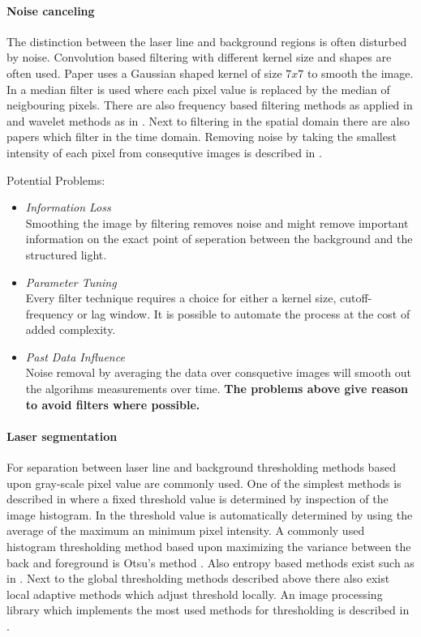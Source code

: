 \paragraph{Noise canceling} \label{p: noise_canceling}
The distinction between the laser line and background regions is often disturbed by noise. Convolution based filtering with different kernel size and shapes are often used. Paper \cite{huang2012development} uses a Gaussian shaped kernel of size $7x7$ to smooth the image. In \cite{zhang2007vision} a median filter is used where each pixel value is replaced by the median of neigbouring pixels. There are also frequency based filtering methods as applied in \cite{uzun2005fpga} and wavelet methods as in \cite{liu2006image}. Next to filtering in the spatial domain there are also papers which filter in the time domain. Removing noise by taking the smallest intensity of each pixel from consequtive images is described in \cite{li2010measurement}.

\skippar
Potential Problems:
\begin{itemize}
\item \textit{Information Loss} \label{pblm: info_loss2} \\
Smoothing the image by filtering removes noise and might remove important information on the exact point of seperation between the background and the structured light. 
\item \textit{Parameter Tuning} \label{pblm: parameter_tuning} \\
Every filter technique requires a choice for either a kernel size, cutoff-frequency or lag window. It is possible to automate the process at the cost of added complexity. 
\item \textit{Past Data Influence} \label{pblm: past_data} \\
Noise removal by averaging the data over consquetive images will smooth out the algorihms measurements over time. \textbf{The problems above give reason to avoid filters where possible.}
\end{itemize}

\paragraph{Laser segmentation}
For separation between laser line and background thresholding methods based upon gray-scale pixel value are commonly used. One of the simplest methods is described in \cite{zhang2007vision} where a fixed threshold value is determined by inspection of the image histogram. In \cite{wang2014weld} the threshold value is automatically determined by using the average of the maximum an minimum pixel intensity. A commonly used histogram thresholding method based upon maximizing the variance between the back and foreground is Otsu's method \cite{otsu1979threshold}. Also entropy based methods exist such as in \cite{liu2006image}. Next to the global thresholding methods described above there also exist local adaptive methods which adjust threshold locally. An image processing library which implements the most used methods for thresholding is described in \cite{itseez2015opencv}.

